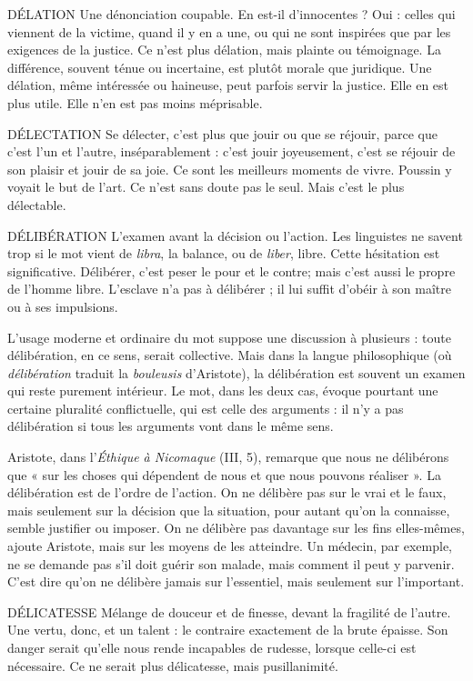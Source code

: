 DÉLATION Une dénonciation coupable. En est-il d’innocentes ? Oui : celles
qui viennent de la victime, quand il y en a une, ou qui ne sont
inspirées que par les exigences de la justice. Ce n’est plus délation, mais plainte
ou témoignage. La différence, souvent ténue ou incertaine, est plutôt morale
que juridique. Une délation, même intéressée ou haineuse, peut parfois servir
la justice. Elle en est plus utile. Elle n’en est pas moins méprisable.

DÉLECTATION Se délecter, c’est plus que jouir ou que se réjouir, parce
que c’est l’un et l’autre, inséparablement : c’est jouir
joyeusement, c’est se réjouir de son plaisir et jouir de sa joie. Ce sont les
meilleurs moments de vivre. Poussin y voyait le but de l’art. Ce n’est sans doute
pas le seul. Mais c’est le plus délectable.

DÉLIBÉRATION L'examen avant la décision ou l’action. Les linguistes ne
savent trop si le mot vient de {\it libra}, la balance, ou de
{\it liber}, libre. Cette hésitation est significative. Délibérer, c’est peser le pour et le
contre; mais c'est aussi le propre de l’homme libre. L’esclave n’a pas à
délibérer ; il lui suffit d’obéir à son maître ou à ses impulsions.

L'usage moderne et ordinaire du mot suppose une discussion à plusieurs :
toute délibération, en ce sens, serait collective. Mais dans la langue philosophique
(où {\it délibération} traduit la {\it bouleusis} d’Aristote), la délibération est souvent
un examen qui reste purement intérieur. Le mot, dans les deux cas, évoque
pourtant une certaine pluralité conflictuelle, qui est celle des arguments : il n’y
a pas délibération si tous les arguments vont dans le même sens.

Aristote, dans l’{\it Éthique à Nicomaque} (III, 5), remarque que nous ne délibérons
que « sur les choses qui dépendent de nous et que nous pouvons réaliser ».
La délibération est de l’ordre de l’action. On ne délibère pas sur le vrai et le
faux, mais seulement sur la décision que la situation, pour autant qu’on la
connaisse, semble justifier ou imposer. On ne délibère pas davantage sur les fins
elles-mêmes, ajoute Aristote, mais sur les moyens de les atteindre. Un médecin,
par exemple, ne se demande pas s’il doit guérir son malade, mais comment il
peut y parvenir. C’est dire qu’on ne délibère jamais sur l’essentiel, mais seulement
sur l'important.

DÉLICATESSE Mélange de douceur et de finesse, devant la fragilité de l’autre.
Une vertu, donc, et un talent : le contraire exactement de
la brute épaisse. Son danger serait qu’elle nous rende incapables de rudesse,
lorsque celle-ci est nécessaire. Ce ne serait plus délicatesse, mais pusillanimité.

